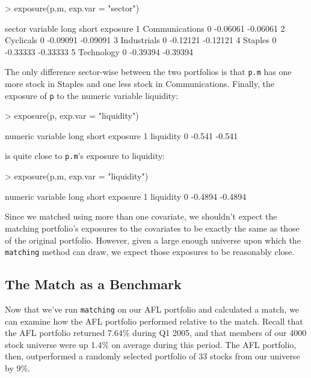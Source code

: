 \documentclass{article}
\begin{document}
\begin{Schunk}
\begin{Sinput}
> exposure(p.m, exp.var = "sector")
\end{Sinput}
\begin{Soutput}
sector 
        variable long    short exposure
1 Communications    0 -0.06061 -0.06061
2      Cyclicals    0 -0.09091 -0.09091
3    Industrials    0 -0.12121 -0.12121
4        Staples    0 -0.33333 -0.33333
5     Technology    0 -0.39394 -0.39394
\end{Soutput}
\end{Schunk}

The only difference sector-wise between the two portfolios is that
\texttt{p.m} has one more stock in Staples and one less stock in
Communications.  Finally, the exposure of \texttt{p} to the numeric
variable liquidity:

\begin{Schunk}
\begin{Sinput}
> exposure(p, exp.var = "liquidity")
\end{Sinput}
\begin{Soutput}
numeric 
   variable long  short exposure
1 liquidity    0 -0.541   -0.541
\end{Soutput}
\end{Schunk}

is quite close to \texttt{p.m}'s exposure to liquidity:

\begin{Schunk}
\begin{Sinput}
> exposure(p.m, exp.var = "liquidity")
\end{Sinput}
\begin{Soutput}
numeric 
   variable long   short exposure
1 liquidity    0 -0.4894  -0.4894
\end{Soutput}
\end{Schunk}

Since we matched using more than one covariate, we shouldn't expect
the matching portfolio's exposures to the covariates to be exactly the
same as those of the original portfolio.  However, given a large
enough universe upon which the \texttt{matching} method can draw, we
expect those exposures to be reasonably close.

\subsection{The Match as a Benchmark}

Now that we've run \texttt{matching} on our AFL portfolio and
calculated a match, we can examine how the AFL portfolio performed
relative to the match.  Recall that the AFL portfolio returned 7.64\%
during Q1 2005, and that members of our 4000 stock universe were up
1.4\% on average during this period.  The AFL portfolio, then,
outperformed a randomly selected portfolio of 33 stocks from our
universe by 9\%.
\end{document}
